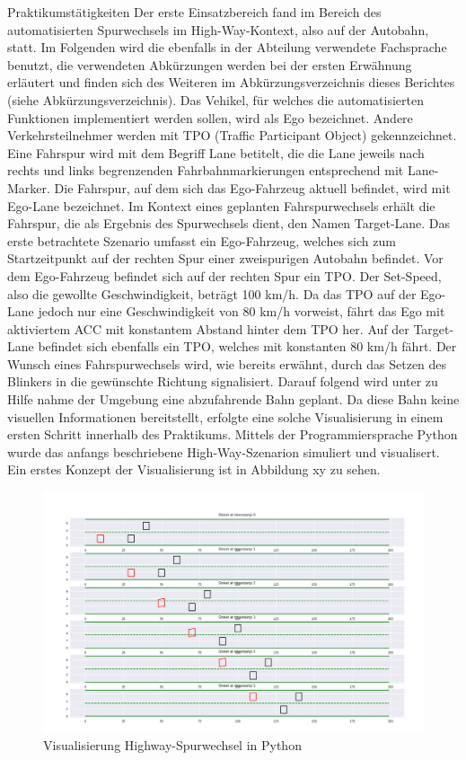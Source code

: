 Praktikumstätigkeiten
Der erste Einsatzbereich fand im Bereich des automatisierten Spurwechsels im High-Way-Kontext, also auf der Autobahn, statt. Im Folgenden wird die ebenfalls in der Abteilung verwendete Fachsprache benutzt, die verwendeten Abkürzungen werden bei der ersten Erwähnung erläutert und finden sich des Weiteren im Abkürzungsverzeichnis dieses Berichtes (siehe Abkürzungsverzeichnis). Das Vehikel, für welches die automatisierten Funktionen implementiert werden sollen, wird als Ego bezeichnet. Andere Verkehrsteilnehmer werden mit TPO (Traffic Participant Object) gekennzeichnet. Eine Fahrspur wird mit dem Begriff Lane betitelt, die die Lane jeweils nach rechts und links begrenzenden Fahrbahnmarkierungen entsprechend mit Lane-Marker. Die Fahrspur, auf dem sich das Ego-Fahrzeug aktuell befindet, wird mit Ego-Lane bezeichnet. Im Kontext eines geplanten Fahrspurwechsels erhält die Fahrspur, die als Ergebnis des Spurwechsels dient, den Namen Target-Lane. Das erste betrachtete Szenario umfasst ein Ego-Fahrzeug, welches sich zum Startzeitpunkt auf der rechten Spur einer zweispurigen Autobahn befindet. Vor dem Ego-Fahrzeug befindet sich auf der rechten Spur ein TPO. Der Set-Speed, also die gewollte Geschwindigkeit, beträgt 100 km/h. Da das TPO auf der Ego-Lane jedoch nur eine Geschwindigkeit von 80 km/h vorweist, fährt das Ego mit aktiviertem ACC mit konstantem Abstand hinter dem TPO her. Auf der Target-Lane befindet sich ebenfalls ein TPO, welches mit konstanten 80 km/h fährt. Der Wunsch eines Fahrspurwechsels wird, wie bereits erwähnt, durch das Setzen des Blinkers in die gewünschte Richtung signalisiert. Darauf folgend wird unter zu Hilfe nahme der Umgebung eine abzufahrende Bahn geplant. Da diese Bahn keine visuellen Informationen bereitstellt, erfolgte eine solche Visualisierung in einem ersten Schritt innerhalb des Praktikums. Mittels der Programmiersprache Python wurde das anfangs beschriebene High-Way-Szenarion simuliert und visualisert. Ein erstes Konzept der Visualisierung ist in Abbildung xy zu sehen. 

\begin{figure}[!ht]
	\begin{center}
		\includegraphics[width=0.8\linewidth]{Abbildungen/bericht/lanechange_visualization}
		\caption{Visualisierung Highway-Spurwechsel in Python}
		\label{fig.highway_spurwechsel_python}
	\end{center}
\end{figure} 

